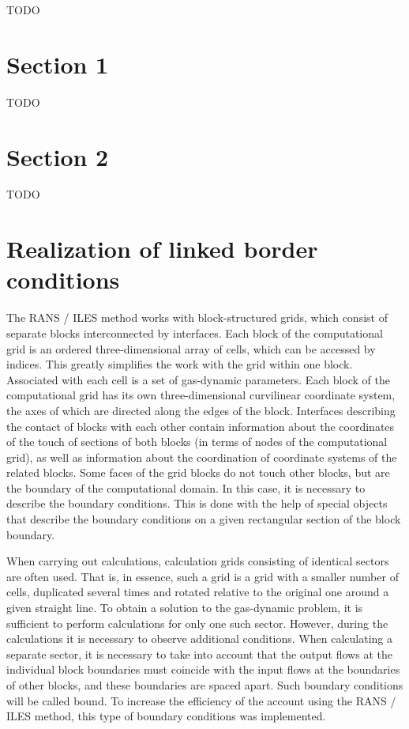 \documentclass[
11pt,%
tightenlines,%
twoside,%
onecolumn,%
nofloats,%
nobibnotes,%
nofootinbib,%
superscriptaddress,%
noshowpacs,%
centertags]%
{revtex4}
\begin{document}
TODO

\section{Section 1}

TODO

\section{Section 2}

TODO

\section{Realization of linked border conditions}

The RANS / ILES method works with block-structured grids, which consist of separate blocks interconnected by interfaces.
Each block of the computational grid is an ordered three-dimensional array of cells, which can be accessed by indices.
This greatly simplifies the work with the grid within one block.
Associated with each cell is a set of gas-dynamic parameters.
Each block of the computational grid has its own three-dimensional curvilinear coordinate system, the axes of which are directed along the edges of the block.
Interfaces describing the contact of blocks with each other contain information about the coordinates of the touch of sections of both blocks (in terms of nodes of the computational grid), as well as information about the coordination of coordinate systems of the related blocks.
Some faces of the grid blocks do not touch other blocks, but are the boundary of the computational domain.
In this case, it is necessary to describe the boundary conditions.
This is done with the help of special objects that describe the boundary conditions on a given rectangular section of the block boundary.

When carrying out calculations, calculation grids consisting of identical sectors are often used.
That is, in essence, such a grid is a grid with a smaller number of cells, duplicated several times and rotated relative to the original one around a given straight line.
To obtain a solution to the gas-dynamic problem, it is sufficient to perform calculations for only one such sector.
However, during the calculations it is necessary to observe additional conditions.
When calculating a separate sector, it is necessary to take into account that the output flows at the individual block boundaries must coincide with the input flows at the boundaries of other blocks, and these boundaries are spaced apart.
Such boundary conditions will be called bound.
To increase the efficiency of the account using the RANS / ILES method, this type of boundary conditions was implemented.
\end{document}

